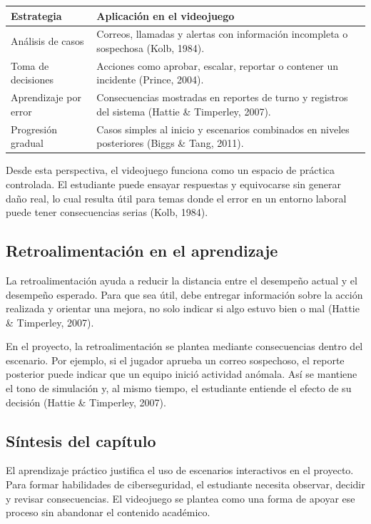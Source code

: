 \begin{center}
\begin{tabular}{|p{}|p{}|}
\hline
\textbf{Estrategia} & \textbf{Aplicaci\'{o}n en el videojuego} \\
\hline
An\'{a}lisis de casos & Correos, llamadas y alertas con informaci\'{o}n incompleta o sospechosa (Kolb, 1984). \\
\hline
Toma de decisiones & Acciones como aprobar, escalar, reportar o contener un incidente (Prince, 2004). \\
\hline
Aprendizaje por error & Consecuencias mostradas en reportes de turno y registros del sistema (Hattie \& Timperley, 2007). \\
\hline
Progresi\'{o}n gradual & Casos simples al inicio y escenarios combinados en niveles posteriores (Biggs \& Tang, 2011). \\
\hline
\end{tabular}
\end{center}

Desde esta perspectiva, el videojuego funciona como un espacio de pr\'{a}ctica controlada. El estudiante puede ensayar respuestas y equivocarse sin generar da\~{n}o real, lo cual resulta \'{u}til para temas donde el error en un entorno laboral puede tener consecuencias serias (Kolb, 1984).

\subsection{Retroalimentaci\'{o}n en el aprendizaje}

La retroalimentaci\'{o}n ayuda a reducir la distancia entre el desempe\~{n}o actual y el desempe\~{n}o esperado. Para que sea \'{u}til, debe entregar informaci\'{o}n sobre la acci\'{o}n realizada y orientar una mejora, no solo indicar si algo estuvo bien o mal (Hattie \& Timperley, 2007).

En el proyecto, la retroalimentaci\'{o}n se plantea mediante consecuencias dentro del escenario. Por ejemplo, si el jugador aprueba un correo sospechoso, el reporte posterior puede indicar que un equipo inici\'{o} actividad an\'{o}mala. As\'{i} se mantiene el tono de simulaci\'{o}n y, al mismo tiempo, el estudiante entiende el efecto de su decisi\'{o}n (Hattie \& Timperley, 2007).

\subsection{S\'{i}ntesis del cap\'{i}tulo}

El aprendizaje pr\'{a}ctico justifica el uso de escenarios interactivos en el proyecto. Para formar habilidades de ciberseguridad, el estudiante necesita observar, decidir y revisar consecuencias. El videojuego se plantea como una forma de apoyar ese proceso sin abandonar el contenido acad\'{e}mico.
